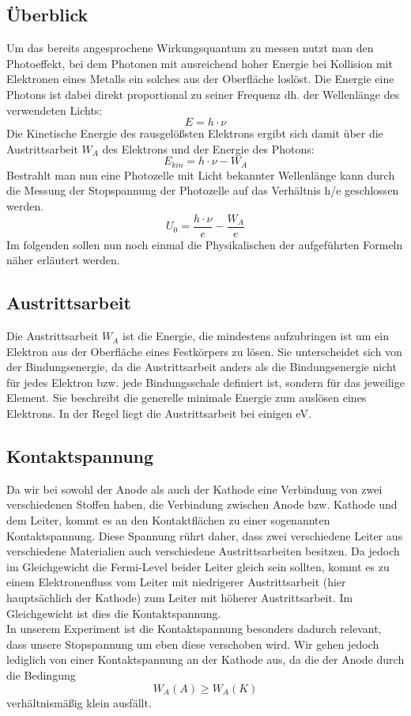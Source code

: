 \documentclass{scrartcl}
\begin{document}
	\subsection{Überblick}
		Um das bereits angesprochene Wirkungsquantum zu messen nutzt man den Photoeffekt, bei dem 
		Photonen mit ausreichend hoher Energie bei Kollision mit Elektronen eines Metalls ein solches 
		aus der Oberfläche loslöst. Die Energie eine Photons ist dabei direkt proportional zu seiner Frequenz dh. der 
		Wellenlänge des verwendeten Lichts:
		\begin{equation}
			E = h \cdot \nu
		\end{equation}
		Die Kinetische Energie des rausgelößsten Elektrons ergibt sich damit über die 
		Austrittsarbeit $W_A$ des Elektrons und der Energie des Photons:
		\begin{equation}
			E_{kin} = h \cdot \nu - W_A
		\end{equation}
		Bestrahlt man nun eine Photozelle mit Licht bekannter Wellenlänge kann durch die Messung der 
		Stopspannung der Photozelle auf das Verhältnis h/e geschlossen werden.
		\begin{equation}
			U_0 = \frac{h\cdot \nu}{e} - \frac{W_A}{e}
		\end{equation}
		Im folgenden sollen nun noch einmal die Physikalischen der aufgeführten Formeln näher erläutert werden.
	\subsection{Austrittsarbeit}
		Die Austrittsarbeit $W_A$ ist die Energie, die mindestens aufzubringen ist um ein Elektron aus 
		der Oberfläche eines Festkörpers zu lösen. Sie unterscheidet sich von der Bindungsenergie, da 
		die Austrittsarbeit anders als die Bindungsenergie nicht für jedes Elektron bzw. jede Bindungsschale definiert
		ist, sondern für das jeweilige Element. Sie beschreibt die generelle minimale Energie zum auslösen eines Elektrons.
		In der Regel liegt die Austrittsarbeit bei einigen eV.
	\subsection{Kontaktspannung}
		Da wir bei sowohl der Anode als auch der Kathode eine Verbindung von zwei verschiedenen Stoffen haben, die Verbindung
		zwischen Anode bzw. Kathode und dem Leiter, kommt es an den Kontaktflächen zu einer sogenannten Kontaktspannung.
		Diese Spannung rührt daher, dass zwei verschiedene Leiter aus verschiedene Materialien auch verschiedene Austrittsarbeiten
		besitzen. Da jedoch im Gleichgewicht die Fermi-Level beider Leiter gleich sein sollten, kommt es zu einem Elektronenfluss
		vom Leiter mit niedrigerer Austrittsarbeit (hier hauptsächlich der Kathode) zum Leiter mit höherer Austrittsarbeit. Im Gleichgewicht
		ist dies die Kontaktspannung.\\
		In unserem Experiment ist die Kontaktspannung besonders dadurch relevant, dass unsere Stopspannung um eben diese verschoben wird. Wir gehen jedoch
		lediglich von einer Kontaktspannung an der Kathode aus, da die der Anode durch die Bedingung
		\begin{equation}
			W_A(A) \geq W_A(K)
		\end{equation}
		verhältnismäßig klein ausfällt.
\end{document}
